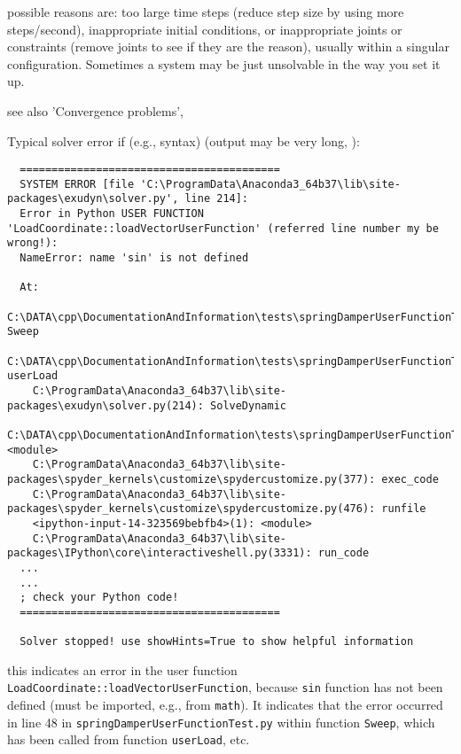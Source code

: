 \item[$\ra$] possible reasons are: too large time steps (reduce step size by using more steps/second), inappropriate initial conditions, or inappropriate joints or constraints (remove joints to see if they are the reason), usually within a singular configuration. Sometimes a system may be just unsolvable in the way you set it up.
\item[$\ra$] see also 'Convergence problems', 
\ei
\item Typical solver error if (e.g., syntax)  (output may be very long, ):
\begin{lstlisting}
  =========================================
  SYSTEM ERROR [file 'C:\ProgramData\Anaconda3_64b37\lib\site-packages\exudyn\solver.py', line 214]: 
  Error in Python USER FUNCTION 'LoadCoordinate::loadVectorUserFunction' (referred line number my be wrong!):
  NameError: name 'sin' is not defined

  At:
    C:\DATA\cpp\DocumentationAndInformation\tests\springDamperUserFunctionTest.py(48): Sweep
    C:\DATA\cpp\DocumentationAndInformation\tests\springDamperUserFunctionTest.py(54): userLoad
    C:\ProgramData\Anaconda3_64b37\lib\site-packages\exudyn\solver.py(214): SolveDynamic
    C:\DATA\cpp\DocumentationAndInformation\tests\springDamperUserFunctionTest.py(106): <module>
    C:\ProgramData\Anaconda3_64b37\lib\site-packages\spyder_kernels\customize\spydercustomize.py(377): exec_code
    C:\ProgramData\Anaconda3_64b37\lib\site-packages\spyder_kernels\customize\spydercustomize.py(476): runfile
    <ipython-input-14-323569bebfb4>(1): <module>
    C:\ProgramData\Anaconda3_64b37\lib\site-packages\IPython\core\interactiveshell.py(3331): run_code
  ...
  ...
  ; check your Python code!
  =========================================

  Solver stopped! use showHints=True to show helpful information
\end{lstlisting}
%
\bi
\item[$\ra$] this indicates an error in the user function \texttt{LoadCoordinate::loadVectorUserFunction}, because \texttt{sin} function has not been defined (must be imported, e.g., from \texttt{math}). It indicates that the error occurred in line 48 in \texttt{springDamperUserFunctionTest.py} within function \texttt{Sweep}, which has been called from function \texttt{userLoad}, etc.
